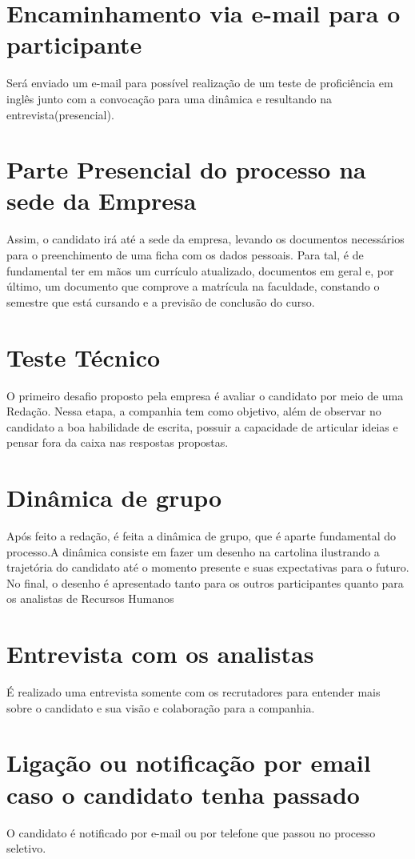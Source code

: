 \section{Encaminhamento via e-mail para o participante}
Será enviado um e-mail para possível realização de um teste de proficiência em inglês junto com a convocação para uma dinâmica e resultando na entrevista(presencial).

\section{ Parte Presencial do processo na sede da Empresa}
Assim, o candidato irá até a sede da empresa, levando os documentos necessários para o preenchimento de uma ficha com os dados pessoais. Para tal, é de fundamental ter em mãos um currículo atualizado, documentos em geral e, por último, um documento que comprove a matrícula na faculdade, constando o semestre que está cursando e a previsão de conclusão do curso.


\section{ Teste Técnico}
O primeiro desafio proposto pela empresa é avaliar o candidato por meio de uma Redação. Nessa etapa, a companhia tem como objetivo, além de observar no candidato a boa habilidade de escrita, possuir a  capacidade de articular ideias e pensar fora da caixa nas respostas propostas.

\section{ Dinâmica de grupo}
Após feito a {redação}, é feita a dinâmica de grupo, que é aparte fundamental do processo.A dinâmica consiste em fazer um desenho na cartolina ilustrando a trajetória do candidato até o momento presente e suas expectativas para o futuro. No final, o desenho é apresentado tanto para os outros participantes quanto para os analistas de Recursos Humanos

\section{ Entrevista com os analistas}
É realizado uma entrevista somente com os recrutadores para entender mais sobre o candidato e sua visão e colaboração para a companhia.

\section{Ligação ou notificação por email caso o candidato tenha passado}
O candidato é notificado por e-mail ou por telefone que passou no processo seletivo.


